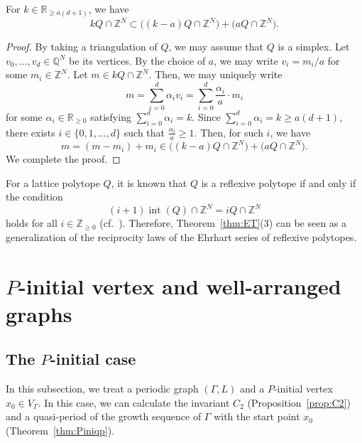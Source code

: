 \documentclass[ALCO,published]{cedram}
\theoremstyle{remark}
\begin{document}
\begin{lem}\label{lem:normalP}
For $k \in \mathbb{R}_{\ge a(d+1)}$, we have 
\[
kQ \cap \mathbb{Z}^N \subset \bigl( (k-a)Q \cap \mathbb{Z}^N \bigr) + \bigl( aQ \cap \mathbb{Z}^N \bigr). 
\]
\end{lem}
\begin{proof}
By taking a triangulation of $Q$, we may assume that $Q$ is a simplex. 
Let $v_0, \ldots , v_d \in \mathbb{Q}^N$ be its vertices. 
By the choice of $a$, we may write $v_i = m_i / a$ for some $m_i \in \mathbb{Z}^N$. 
Let $m \in kQ \cap \mathbb{Z}^N$. 
Then, we may uniquely write 
\[
m = \sum _{i=0} ^d \alpha_i v_i = \sum _{i=0} ^d \frac{\alpha _i}{a} \cdot m_i
\]
for some $\alpha _i \in \mathbb{R}_{\ge 0}$ satisfying $\sum _{i=0} ^d \alpha _i = k$. 
Since $\sum _{i=0} ^d \alpha _i = k \ge a(d+1)$, there exists $i \in \{ 0, 1, \ldots , d \}$ 
such that $\frac{\alpha _i}{a} \ge 1$. 
Then, for such $i$, we have 
\[
m = (m-m_i)+m_i \in \bigl( (k-a)Q \cap \mathbb{Z}^N \bigr) + \bigl( aQ \cap \mathbb{Z}^N \bigr). 
\]
We complete the proof. 
\end{proof}

\begin{rmk}\label{rmk:ref2}
For a lattice polytope $Q$, it is known that $Q$ is a reflexive polytope if and only if the condition 
\[
(i+1) \operatorname{int}(Q) \cap \mathbb{Z}^N = iQ \cap \mathbb{Z}^N
\]
holds for all $i \in \mathbb{Z}_{\ge 0}$ (cf.~\cite[Section 4.4]{BR}). 
Therefore, Theorem~\ref{thm:ET}(3) can be seen as a generalization of the reciprocity laws of the Ehrhart series of reflexive polytopes. 
\end{rmk}

\section{\texorpdfstring{$P$}{P}-initial vertex and well-arranged graphs}\label{section:PiniWA}
\subsection{The \texorpdfstring{$P$}{P}-initial case}
In this subsection, we treat a periodic graph $(\Gamma, L)$ and a $P$-initial vertex $x_0 \in V_{\Gamma}$. 
In this case, we can calculate the invariant $C_2$ (Proposition~\ref{prop:C2}) and 
a quasi-period of the growth sequence of $\Gamma$ with the start point $x_0$ (Theorem~\ref{thm:Piniqp}).  
\end{document}
